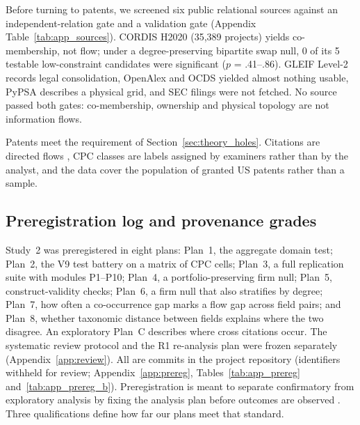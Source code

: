 Before turning to patents, we screened six public relational sources against an independent-relation gate and a validation gate (Appendix Table~\ref{tab:app_sources}). CORDIS H2020 (35,389 projects) yields co-membership, not flow; under a degree-preserving bipartite swap null, 0 of its 5 testable low-constraint candidates were significant ($p$ = .41--.86). GLEIF Level-2 records legal consolidation, OpenAlex and OCDS yielded almost nothing usable, PyPSA describes a physical grid, and SEC filings were not fetched. No source passed both gates: co-membership, ownership and physical topology are not information flows.

Patents meet the requirement of Section~\ref{sec:theory_holes}. Citations are directed flows \citep{jaffe1993geographic}, CPC classes are labels assigned by examiners rather than by the analyst, and the data cover the population of granted US patents rather than a sample.

\subsection{Preregistration log and provenance grades}
\label{sec:design_prereg}

Study~2 was preregistered in eight plans: Plan~1, the aggregate domain test; Plan~2, the V9 test battery on a matrix of CPC cells; Plan~3, a full replication suite with modules P1--P10; Plan~4, a portfolio-preserving firm null; Plan~5, construct-validity checks; Plan~6, a firm null that also stratifies by degree; Plan~7, how often a co-occurrence gap marks a flow gap across field pairs; and Plan~8, whether taxonomic distance between fields explains where the two disagree. An exploratory Plan~C describes where cross citations occur. The systematic review protocol and the R1 re-analysis plan were frozen separately (Appendix~\ref{app:review}). All are commits in the project repository (identifiers withheld for review; Appendix~\ref{app:prereg}, Tables~\ref{tab:app_prereg} and~\ref{tab:app_prereg_b}). Preregistration is meant to separate confirmatory from exploratory analysis by fixing the analysis plan before outcomes are observed \citep{nosek2018preregistration}. Three qualifications define how far our plans meet that standard.

